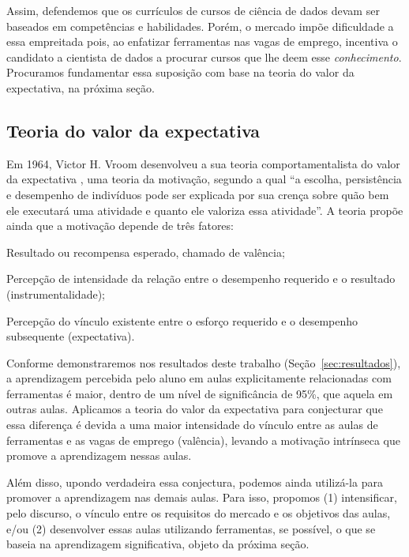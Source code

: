 Assim, defendemos que os currículos de cursos de ciência de dados devam ser baseados em competências e habilidades.
Porém, o mercado impõe dificuldade a essa empreitada pois, ao enfatizar ferramentas nas vagas de emprego, incentiva o candidato a cientista de dados a procurar cursos que lhe deem esse \emph{conhecimento}.
Procuramos fundamentar essa suposição com base na teoria do valor da expectativa, na próxima seção.

\subsection{Teoria do valor da expectativa}\label{sec:tve}

Em 1964, Victor H. Vroom desenvolveu a sua teoria comportamentalista do valor da expectativa \cite{Petri}, uma teoria da motivação, segundo a qual ``a escolha, persistência e desempenho de indivíduos pode ser explicada por sua crença sobre quão bem ele executará uma atividade e quanto ele valoriza essa atividade''.
A teoria propõe ainda que a motivação depende de três fatores: 
\begin{compactitem}
	\item Resultado ou recompensa esperado, chamado de valência;
	\item Percepção de intensidade da relação entre o desempenho requerido e o resultado (instrumentalidade);
	\item Percepção do vínculo existente entre o esforço requerido e o desempenho subsequente (expectativa).
\end{compactitem}

Conforme demonstraremos nos resultados deste trabalho (Seção~\ref{sec:resultados}), a aprendizagem percebida pelo aluno em aulas explicitamente relacionadas com ferramentas é maior, dentro de um nível de significância de 95\%, que aquela em outras aulas.
Aplicamos a teoria do valor da expectativa para conjecturar que essa diferença é devida a uma maior intensidade do vínculo entre as aulas de ferramentas e as vagas de emprego (valência), levando a motivação intrínseca que promove a aprendizagem nessas aulas.

Além disso, upondo verdadeira essa conjectura, podemos ainda utilizá-la para promover a aprendizagem nas demais aulas.
Para isso, propomos (1) intensificar, pelo discurso, o vínculo entre os requisitos do mercado e os objetivos das aulas, e/ou (2) desenvolver essas aulas utilizando ferramentas, se possível, o que se baseia na aprendizagem significativa, objeto da próxima seção.

